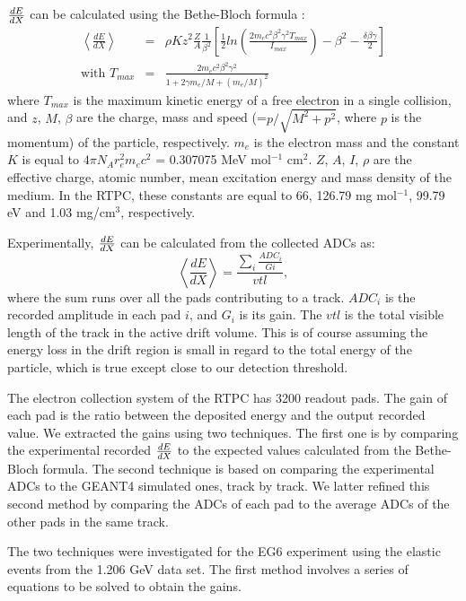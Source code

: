 $\small{\frac{dE}{dX}}$ can be calculated using the Bethe-Bloch formula \cite{bethe_block}:
\begin{eqnarray}
\left\langle \frac{dE}{dX} \right\rangle &=& \rho K z^{2} \frac{Z}{A} 
   \frac{1}{\beta^{2}} \left[ \frac{1}{2} ln 
   \left(\frac{2m_{e}c^{2}\beta^{2}\gamma^{2}T_{max}}{I_{max}} \right) - 
\beta^{2} -\frac{\delta\beta\gamma}{2}\right]\\
\text{with }
T_{max} &=& \frac{2m_{e}c^{2}\beta^{2}\gamma^{2}}{1+2\gamma m_{e}/M + (m_{e}/M)^{2}} 
\end{eqnarray}
where $T_{max}$ is the maximum kinetic energy of a free electron in a single 
collision, and $z$, $M$, $\beta$ are the charge, mass and speed (=$p/ \sqrt{M^2 
+ p^2}$, where $p$ is the momentum) of the particle, respectively.  $m_{e}$ is 
the electron mass and the constant $K$ is equal to $4 \pi N_{A} 
r^{2}_{e}m_{e}c^{2}$ = 0.307075 MeV mol$^{-1}$ cm$^{2}$. $Z$, $A$, $I$, $\rho$ 
are the effective charge, atomic number, mean excitation energy and mass 
density of the medium. In the RTPC, these constants are equal to 66, 126.79 mg 
mol$^{-1}$, 99.79 eV and 1.03 mg/cm$^3$, respectively. 

Experimentally, $\small{\frac{dE}{dX}}$ can be calculated from the collected ADCs as: 
\begin{equation}
 \left\langle \frac{dE}{dX} \right\rangle= \frac{\sum\limits_{i} \frac{ADC_{i}}{Gi}}{vtl},
\end{equation}
where the sum runs over all the pads contributing to a track. $ADC_{i}$ is the 
recorded amplitude in each pad $i$, and $G_{i}$ is its gain. The $vtl$ is the 
total visible length of the track in the active drift volume. This is of course 
assuming the energy loss in the drift region is small in regard to the total 
energy of the particle, which is true except close to our detection 
threshold.

The electron collection system of the RTPC has 3200 readout pads. The gain of 
each pad is the ratio between the deposited energy and the output recorded 
value. We extracted the gains using two techniques. The first one is by 
comparing the experimental recorded $\small{\frac{dE}{dX}}$ to the expected 
values calculated from the Bethe-Bloch formula. The second technique is based 
on comparing the experimental ADCs to the GEANT4 simulated ones, track by 
track. We latter refined this second method by comparing the ADCs of each pad 
to the average ADCs of the other pads in the same track.

The two techniques were investigated for the EG6 experiment using the elastic 
events from the 1.206 GeV data set. The first method involves a series of 
equations to be solved to obtain the gains.
 
